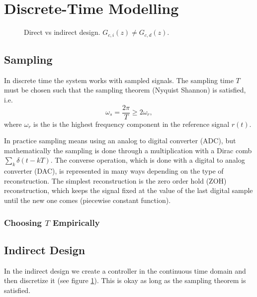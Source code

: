 
\section{Discrete-Time Modelling}

\begin{figure}
	\centering
	
	\caption{
		Direct vs indirect design. \(G_{c,i}(z) \neq G_{c,d}(z)\).
		\label{fig:direct-vs-indirect}
	}
\end{figure}

\subsection{Sampling}

In discrete time the system works with sampled signals. The sampling time \(T\) must be chosen such that the sampling theorem (Nyquist Shannon) is satisfied, i.e.
\[
	\omega_s = \frac{2\pi}{T} \geq 2 \omega_r,
\]
where \(\omega_r\) is the is the highest frequency component in the reference signal \(r(t)\).

In practice sampling means using an analog to digital converter (ADC), but mathematically the sampling is done through a multiplication with a Dirac comb \(\sum_k \delta(t - kT)\). The converse operation, which is done with a digital to analog converter (DAC), is represented in many ways depending on the type of reconstruction. The simplest reconstruction is the zero order hold (ZOH) reconstruction, which keeps the signal fixed at the value of the last digital sample until the new one comes (piecewise constant function).

\subsubsection{Choosing \(T\) Empirically}



\subsection{Indirect Design}

In the indirect design we create a controller in the continuous time domain and then discretize it (see figure \ref{fig:direct-vs-indirect}). This is okay as long as the sampling theorem is satisfied.

